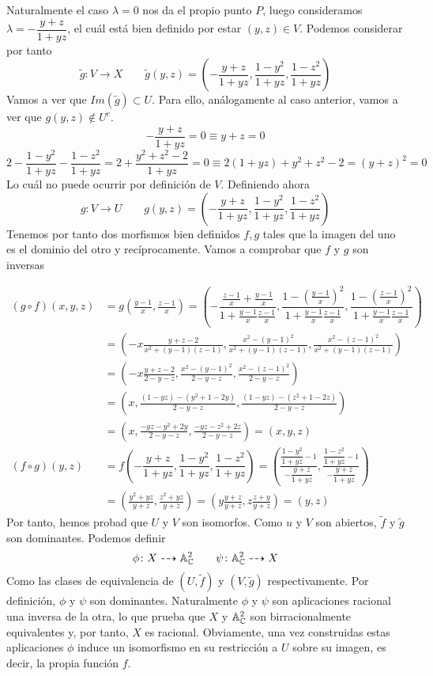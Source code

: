 \documentclass[twoside]{article}
\begin{document}
\begin{solucion}
Naturalmente el caso $\lambda =0$ nos da el propio punto $P$, luego consideramos $\lambda = -\dfrac{y+z}{1+yz}$, el cuál está bien definido por estar $(y,z)\in V$. Podemos considerar por tanto
$$
\tilde{g}\colon  V \rightarrow X \qquad \tilde{g}(y,z) =\left(-\dfrac{y+z}{1+yz},\dfrac{1-y^2}{1+yz},\dfrac{1-z^2}{1+yz}\right) 
$$
Vamos a ver que $Im(\tilde{g})\subset U$. Para ello, análogamente al caso anterior, vamos a ver que $g(y,z)\notin U^c$. 
$$
-\frac{y+z}{1+yz} = 0 \equiv y+z = 0
$$
$$
2-\frac{1-y^2}{1+yz}-\frac{1-z^2}{1+yz} = 2 + \frac{y^2+z^2-2}{1+yz} =0 \equiv 2(1+yz) +y^2 +z^2 -2 = (y+z)^2 = 0 
$$
Lo cuál no puede ocurrir por definición de $V$. Definiendo ahora
$$
{g}\colon  V \rightarrow U \qquad {g}(y,z) =\left(-\dfrac{y+z}{1+yz},\dfrac{1-y^2}{1+yz},\dfrac{1-z^2}{1+yz}\right) 
$$
Tenemos por tanto dos morfismos bien definidos $f,g$ tales que la imagen del uno es el dominio del otro y recíprocamente. Vamos a comprobar que $f$ y $g$ son inversas

\begin{align*}
(g\circ f)(x,y,z)& = g\left(\frac{y-1}{x},\frac{z-1}{x}\right) =\left(-\dfrac{\frac{z-1}{x}+\frac{y-1}{x}}{1+\frac{y-1}{x}\frac{z-1}{x}},\dfrac{1-\left(\frac{y-1}{x}\right)^2}{1+\frac{y-1}{x}\frac{z-1}{x}},\dfrac{1-\left(\frac{z-1}{x}\right)^2}{1+\frac{y-1}{x}\frac{z-1}{x}}\right) \\
&= \left(-x\frac{y+z-2}{x^2+(y-1)(z-1)},\frac{x^2-(y-1)^2}{x^2+(y-1)(z-1)},\frac{x^2-(z-1)^2}{x^2+(y-1)(z-1)}\right)\\
&=\left(-x\frac{y+z-2}{2 -y-z},\frac{x^2-(y-1)^2}{2 -y-z},\frac{x^2-(z-1)^2}{2 -y-z}\right)\\
&= \left(x,\frac{(1-yz)-(y^2+1-2y)}{2 -y-z},\frac{(1-yz)-(z^2+1-2z)}{2 -y-z}\right)\\
&= \left(x,\frac{-yz-y^2+2y}{2 -y-z},\frac{-yz-z^2+2z}{2 -y-z}\right)=(x,y,z)\\
(f\circ g)(y,z) &= f\left(-\dfrac{y+z}{1+yz},\dfrac{1-y^2}{1+yz},\dfrac{1-z^2}{1+yz}\right) = \left( \frac{\dfrac{1-y^2}{1+yz}-1}{-\dfrac{y+z}{1+yz}},\frac{\dfrac{1-z^2}{1+yz}-1}{-\dfrac{y+z}{1+yz}}\right) \\
&=  \left( \frac{{y^2}+yz}{y+z},\frac{{z^2}+yz}{y+z}\right) =   \left( y\frac{{y}+z}{y+z},z\frac{{z}+y}{y+z}\right)= (y,z)
\end{align*}
Por tanto, hemos probad que $U$ y $V$ son isomorfos. Como $u$ y $V$ son abiertos, $\tilde{f}$ y $\tilde{g}$ son dominantes. Podemos definir
$$
\phi \colon X \dashrightarrow \mathbb{A}_{\mathbb{C}}^2 \qquad \psi \colon \mathbb{A}_{\mathbb{C}}^2 \dashrightarrow X
$$
Como las clases de equivalencia de $(U,\tilde{f})$ y $(V,\tilde{g})$ respectivamente. Por definición, $\phi$ y $\psi$ son dominantes. Naturalmente $\phi$ y $\psi$ son aplicaciones racional una inversa de la otra, lo que prueba que $X$ y $\mathbb{A}_{\mathbb{C}}^2$ son birracionalmente equivalentes y, por tanto, $X$ es racional. Obviamente, una vez construidas estas aplicaciones $\phi$ induce un isomorfismo en su restricción a $U$ sobre su imagen, es decir, la propia función $f$.
\end{solucion}
\end{document}

